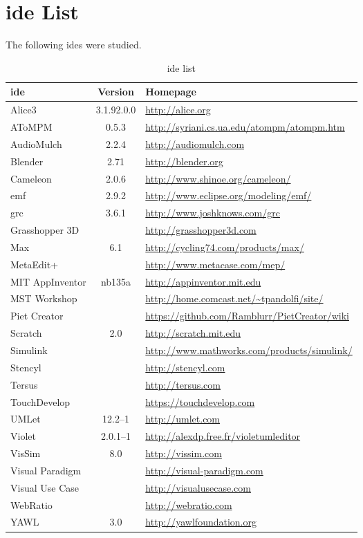 \section{\acs{ide} List}
\label{sec:ide_list}

The following \acp{ide} were studied.

\noindent
\begin{table}[!htb]\centering
{}
\label{table:ides}
\begin{tabularx}{\textwidth}{@{}lcX@{}}\toprule
  \textbf{\ac{ide}} & \textbf{Version} & \textbf{Homepage} \\
  \midrule
  Alice3 & 3.1.92.0.0 & \url{http://alice.org} \\
  AToMPM & 0.5.3 & \url{http://syriani.cs.ua.edu/atompm/atompm.htm} \\
  AudioMulch & 2.2.4 & \url{http://audiomulch.com} \\
  Blender & 2.71 & \url{http://blender.org} \\
  Cameleon & 2.0.6 & \url{http://www.shinoe.org/cameleon/} \\
  \ac{emf} & 2.9.2 & \url{http://www.eclipse.org/modeling/emf/} \\
  \ac{grc} & 3.6.1 & \url{http://www.joshknows.com/grc} \\
  Grasshopper 3D & & \url{http://grasshopper3d.com} \\
  Max & 6.1 & \url{http://cycling74.com/products/max/} \\
  MetaEdit+ & & \url{http://www.metacase.com/mep/} \\
  MIT AppInventor & nb135a & \url{http://appinventor.mit.edu} \\
  MST Workshop & & \url{http://home.comcast.net/~tpandolfi/site/} \\
  Piet Creator & & \url{https://github.com/Ramblurr/PietCreator/wiki} \\
  Scratch & 2.0 & \url{http://scratch.mit.edu} \\
  Simulink & & \url{http://www.mathworks.com/products/simulink/} \\
  Stencyl & & \url{http://stencyl.com} \\
  Tersus & & \url{http://tersus.com} \\
  TouchDevelop & & \url{https://touchdevelop.com} \\
  UMLet & 12.2--1 & \url{http://umlet.com} \\
  Violet & 2.0.1--1 & \url{http://alexdp.free.fr/violetumleditor} \\
  VisSim & 8.0 & \url{http://vissim.com} \\
  Visual Paradigm & & \url{http://visual-paradigm.com} \\
  Visual Use Case & & \url{http://visualusecase.com} \\
  WebRatio & & \url{http://webratio.com} \\
  YAWL & 3.0 & \url{http://yawlfoundation.org} \\
  \bottomrule
\end{tabularx}
\caption{\ac{ide} list}
\end{table}
